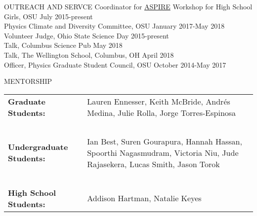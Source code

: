 \documentclass{resume} %
\begin{document}
\begin{rSection}{OUTREACH AND SERVCE}
Coordinator for \href{u.osu.edu/aspire}{ASPIRE} Workshop for High School Girls, OSU \hfill July 2015-present\\
Physics Climate and Diversity Committee, OSU \hfill January 2017-May 2018\\
Volunteer Judge, Ohio State Science Day \hfill 2015-present\\
Talk, Columbus Science Pub \hfill  May 2018\\
Talk, The Wellington School, Columbus, OH \hfill April 2018\\
Officer, Physics Graduate Student Council, OSU \hfill October 2014-May 2017 \\
\end{rSection}
\vspace{-0.30cm}


\begin{rSection}{MENTORSHIP}
\begin{table}[h]
\begin{tabularx}{\textwidth}{l X}
 {\bf Graduate Students:}  & Lauren Ennesser, Keith McBride, Andr\'es Medina, Julie Rolla,  \hspace{1cm} Jorge Torres-Espinosa \\
 ~ & ~ \\
{\bf Undergraduate Students:}  & Ian Best, Suren Gourapura, Hannah Hassan, Spoorthi Nagasmudram, Victoria Niu, Jude Rajasekera, Lucas Smith, Jason Torok \\
~ & ~ \\
{\bf High School Students:} &  Addison Hartman, Natalie Keyes\\
\end{tabularx}
\end{table}
\end{rSection}
\end{document}
